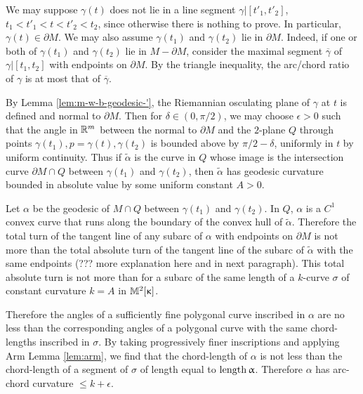 We may suppose  $\gamma(t)$  does not lie in a line segment $\gamma|[t'_1,t'_2]$,  $t_1<t'_1<t<t'_2<t_2$, since otherwise there is nothing to prove. In particular, $\gamma(t)\in\partial M$. We may also assume $\gamma(t_1)$ and $\gamma(t_2)$ lie in $\partial M$. Indeed, if one or both of $\gamma(t_1)$ and $\gamma(t_2)$ lie in $M-\partial M$, consider the maximal segment $\overline{\gamma}$ of $\gamma|[t_1,t_2]$ with endpoints on $\partial M$.  By the triangle inequality, the arc/chord ratio of $\gamma$ is at most that of $\overline{\gamma}$.



By Lemma \ref{lem:m-w-b-geodesic-'}, the 
Riemannian osculating plane of $\gamma$ at $t$ is defined and normal to $\partial M$.
Then for $\delta\in (0,\pi/2)$, we may choose $\epsilon>0$  such that  the  angle  in $\mathbb{R}^m$ between the normal to $\partial M$ and the $2$-plane $Q$ through points $\gamma(t_1), p=\gamma(t), \gamma(t_2)$ is bounded above by $\pi/2-\delta$, uniformly in $t$ by uniform continuity. 
Thus if $\tilde\alpha$ is the curve in $Q$  whose image is the intersection curve $\partial M\cap Q$ 
between $\gamma(t_1)$ and $\gamma(t_2)$, then  $\tilde\alpha$ has  geodesic curvature bounded in absolute value by some uniform constant $A>0$.%

Let $\alpha$ be the geodesic of $M\cap Q$ between $\gamma(t_1)$ and $\gamma(t_2)$. 
  In $Q$, $\alpha$ is a $C^1$ convex curve that runs along the boundary of the convex hull of $\tilde\alpha$.  Therefore the total turn of  the tangent line of any subarc of  $\alpha$ with endpoints on $\partial M$  is not more than the total absolute turn of the tangent line of the subarc of  $\tilde\alpha$ with the same endpoints (??? more explanation here and in next paragraph).  
This total absolute turn is not more than for a subarc of the same length of a $k$-curve $\sigma$ of constant curvature $k=A$ in $\mathbb{M}_{{}}^{2}[{\upkappa}]$.  

Therefore the angles of a sufficiently fine polygonal curve inscribed in $\alpha$  are no less than the corresponding angles of a polygonal curve with the same chord-lengths inscribed in $\sigma$.
 By taking progressively finer inscriptions and applying Arm Lemma \ref{lem:arm}, we find that the chord-length of $\alpha$ is not less than the chord-length of a segment of $\sigma$ of length equal to  $\mathop{\rm length}\nolimits\upalpha$. Therefore $\alpha$ has arc-chord curvature $\le k+\epsilon$.
 
